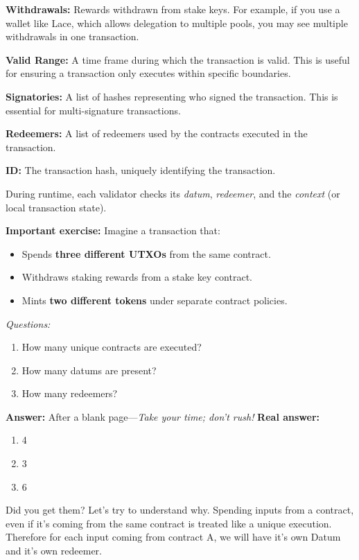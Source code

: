 \textbf{Withdrawals:} Rewards withdrawn from stake keys. For example, if you use a wallet like Lace, which allows delegation to multiple pools, you may see multiple withdrawals in one transaction.

\textbf{Valid Range:} A time frame during which the transaction is valid. This is useful for ensuring a transaction only executes within specific boundaries.

\textbf{Signatories:} A list of hashes representing who signed the transaction. This is essential for multi-signature transactions.

\textbf{Redeemers:} A list of redeemers used by the contracts executed in the transaction.

\textbf{ID:} The transaction hash, uniquely identifying the transaction.

During runtime, each validator checks its \textit{datum}, \textit{redeemer}, and the \textit{context} (or local transaction state).

\textbf{Important exercise:} 
Imagine a transaction that:
\begin{itemize}
    \item Spends \textbf{three different UTXOs} from the same contract.
    \item Withdraws staking rewards from a stake key contract.
    \item Mints \textbf{two different tokens} under separate contract policies.
\end{itemize}

\textit{Questions:}
\begin{enumerate}
    \item How many unique contracts are executed?
    \item How many datums are present?
    \item How many redeemers?
\end{enumerate}

\textbf{Answer:} After a blank page—\textit{Take your time; don’t rush!}
\newpage
\thispagestyle{empty}
\textbf{Real answer:}

\begin{enumerate}
    \item 4
    \item 3
    \item 6
\end{enumerate}

Did you get them? Let's try to understand why.
Spending inputs from a contract, even if it's coming from the same contract is treated like a unique execution.
Therefore for each input coming from contract A, we will have it's own Datum and it's own redeemer. 


